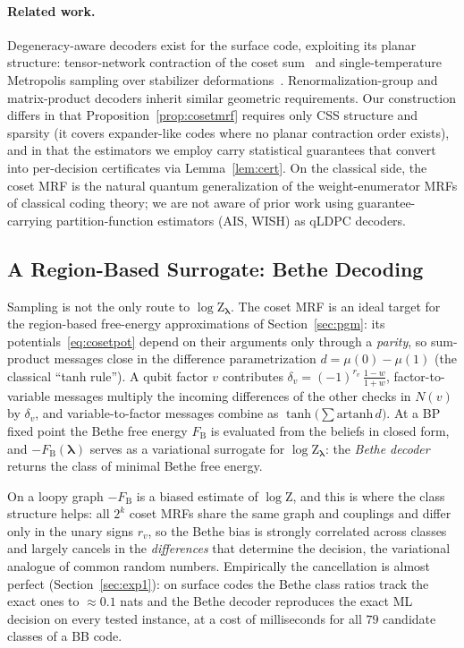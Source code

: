 \documentclass[a4paper,11pt]{quantumarticle}
\theoremstyle{definition}
\newcommand{\vlam}{\boldsymbol{\lambda}}
\newcommand{\Z}{\mathrm{Z}}
\begin{document}
\paragraph{Related work.}
Degeneracy-aware decoders exist for the surface code, exploiting its planar
structure: tensor-network contraction of the coset sum~\cite{bravyi2014ml}
and single-temperature Metropolis sampling over stabilizer
deformations~\cite{hutter2014}. Renormalization-group and matrix-product
decoders inherit similar geometric requirements. Our construction differs in
that Proposition~\ref{prop:cosetmrf} requires only CSS structure and
sparsity (it covers expander-like codes where no planar contraction order
exists), and in that the estimators we employ carry statistical guarantees
that convert into per-decision certificates via Lemma~\ref{lem:cert}. On the
classical side, the coset MRF is the natural quantum generalization of the
weight-enumerator MRFs of classical coding theory; we are not aware of prior
work using guarantee-carrying partition-function estimators (AIS, WISH) as
qLDPC decoders.

\subsection{A Region-Based Surrogate: Bethe Decoding}
\label{sec:bethe}
Sampling is not the only route to $\log\Z_{\vlam}$. The coset MRF is an
ideal target for the region-based free-energy approximations of
Section~\ref{sec:pgm}: its potentials~\eqref{eq:cosetpot} depend on their
arguments only through a \emph{parity}, so sum-product messages close in
the difference parametrization $d=\mu(0)-\mu(1)$ (the classical ``tanh
rule''). A qubit factor $v$ contributes
$\delta_v=(-1)^{r_v}\,\frac{1-w}{1+w}$, factor-to-variable messages
multiply the incoming differences of the other checks in $N(v)$ by
$\delta_v$, and variable-to-factor messages combine as
$\tanh\!\big(\sum\mathrm{artanh}\,d\big)$. At a BP fixed point the Bethe
free energy $F_{\mathrm{B}}$ is evaluated from the beliefs in closed form,
and $-F_{\mathrm{B}}(\vlam)$ serves as a variational surrogate for
$\log\Z_{\vlam}$: the \emph{Bethe decoder} returns the class of minimal
Bethe free energy.

On a loopy graph $-F_{\mathrm{B}}$ is a biased estimate of $\log\Z$, and
this is where the class structure helps: all $2^k$ coset MRFs share the
same graph and couplings and differ only in the unary signs $r_v$, so the
Bethe bias is strongly correlated across classes and largely cancels in the
\emph{differences} that determine the decision, the variational analogue
of common random numbers. Empirically the cancellation is almost perfect
(Section~\ref{sec:exp1}): on surface codes the Bethe class ratios track the
exact ones to $\approx0.1$ nats and the Bethe decoder reproduces the exact
ML decision on every tested instance, at a cost of milliseconds for all
$79$ candidate classes of a BB code.
\end{document}
